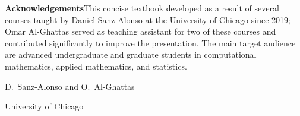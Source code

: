 \vspace{1em}
\textbf{Acknowledgements}\quad This concise textbook developed as a result of several courses
taught by Daniel Sanz-Alonso at the University of Chicago since 2019; Omar Al-Ghattas served
as teaching assistant for two of these courses and contributed significantly to improve the
presentation. The main target audience are advanced undergraduate and graduate students in
computational mathematics, applied mathematics, and statistics.

\hfill D.\ Sanz-Alonso and O.\ Al-Ghattas

\hfill University of Chicago

\tableofcontents

\mainmatter
